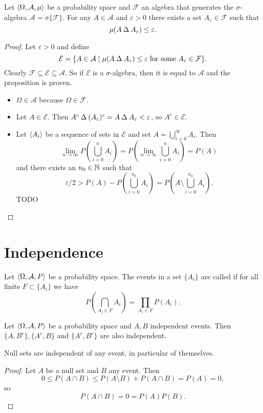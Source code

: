 \begin{proposition}
Let $\left\langle \Omega, \mathcal{A}, \mu \right\rangle$ be a probability space and $\mathcal{F}$ an algebra that generates the $\sigma$-algebra $\mathcal{A} = \sigma\{\mathcal{F}\}$. For any $A\in\mathcal{A}$ and $\varepsilon > 0$ there exists a set $A_\varepsilon \in \mathcal{F}$ such that
\[ \mu(A\mathbin{\Delta} A_\varepsilon) \leq \varepsilon. \] 
\end{proposition}
\begin{proof}
Let $\varepsilon > 0$ and define
\[ \mathcal{E} = \setbuilder{A\in\mathcal{A}}{\mu(A\symdiff A_\varepsilon) \leq \varepsilon\;\text{for some}\; A_\varepsilon\in\mathcal{F}}. \]
Clearly $\mathcal{F} \subseteq \mathcal{E} \subseteq \mathcal{A}$. So if $\mathcal{E}$ is a $\sigma$-algebra, then it is equal to $\mathcal{A}$ and the proposition is proven.
\begin{itemize}
\item $\Omega \in \mathcal{A}$ because $\Omega \in \mathcal{F}$.
\item Let $A\in \mathcal{E}$. Then $A^c\mathbin{\Delta} (A_\varepsilon)^c = A\mathbin{\Delta} A_\varepsilon < \varepsilon$, so $A^c\in \mathcal{E}$.
\item Let $\left\langle A_i \right\rangle$ be a sequence of sets in $\mathcal{E}$ and set $A = \bigcup_{i= 0}^\infty A_i$. Then
\[ \lim_{n\to\infty}P\left(\bigcup_{i=0}^n A_i\right) = P\left(\lim_{n\to\infty}\bigcup_{i=0}^n A_i\right) = P(A) \]
and there exists an $n_0\in\mathbb{N}$ such that
\[ \varepsilon/2 > P(A) - P\left(\bigcup_{i=0}^{n_0} A_i\right) = P\left(A\setminus \bigcup_{i=0}^{n_0} A_i\right). \]
TODO
\end{itemize}
\end{proof}

\section{Independence}
\begin{definition}
Let $\left\langle \Omega, \mathcal{A}, P \right\rangle$ be a probability space. The events in a set $\{A_i\}$ are called  if for all finite $F\subset \{A_i\}$ we have
\[ P\left(\bigcap_{A_i\in F}A_i\right) = \prod_{A_i\in F}P(A_i). \]
\end{definition}

\begin{lemma}
Let $\left\langle \Omega, \mathcal{A}, P \right\rangle$ be a probability space and $A,B$ independent events. Then $\{A,B^c\}, \{A^c,B\}$ and $\{A^c, B^c\}$ are also independent.
\end{lemma}
\begin{lemma}
Null sets are independent of any event, in particular of themselves.
\end{lemma}
\begin{proof}
Let $A$ be a null set and $B$ any event. Then
\[ 0\leq P(A\cap B) \leq P(A\setminus B) + P(A\cap B) = P(A) = 0, \]
so 
\[ P(A\cap B) = 0 =  P(A)P(B).  \]
\end{proof}

